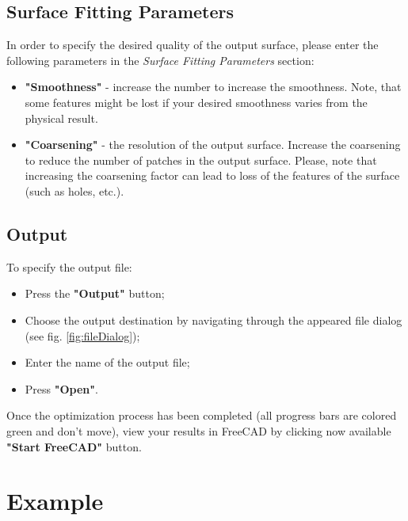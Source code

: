\documentclass[
12pt, %
a4paper, %
oneside, %
headinclude,footinclude, %
BCOR5mm, %
]{scrartcl}
\begin{document}
\subsection{Surface Fitting Parameters}
In order to specify the desired quality of the output surface, please enter the following parameters in the \textit{Surface Fitting Parameters} section:
\begin{itemize}
\item \textbf{"Smoothness"} - increase the number to increase the smoothness. Note, that some features might be lost if your desired smoothness varies from the physical result.
\item \textbf{"Coarsening"} - the resolution of the output surface.  Increase the coarsening to reduce the number of patches in the output surface. Please, note that increasing the coarsening factor can lead to loss of the features of the surface (such as holes, etc.).
\end{itemize}
\subsection{Output}
To specify the output file:
\begin{itemize}
\item Press the \textbf{"Output"} button;
\item Choose the output destination by navigating through the appeared file dialog (see fig. \ref{fig:fileDialog});
\item Enter the name of the output file;
\item Press \textbf{"Open"}.
\end{itemize}

Once the optimization process has been completed (all progress bars are colored green and don't move), view your results in FreeCAD by clicking now available \textbf{"Start FreeCAD"} button.

\section{Example}
\end{document}

